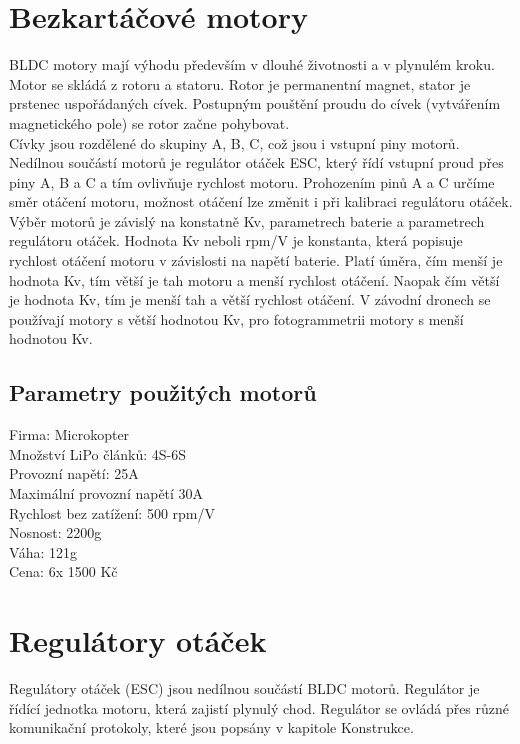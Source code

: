 \section{Bezkartáčové motory} 
BLDC motory mají výhodu především v dlouhé životnosti a v plynulém kroku. Motor se skládá z rotoru a statoru. Rotor je permanentní magnet, stator je prstenec uspořádaných cívek. Postupným pouštění proudu do cívek (vytvářením magnetického pole) se rotor začne pohybovat.\\
Cívky jsou rozdělené do skupiny A, B, C, což jsou i vstupní piny motorů.  Nedílnou součástí motorů je regulátor otáček ESC, který řídí vstupní proud přes piny A, B a C a tím ovlivňuje rychlost motoru. Prohozením pinů A a C určíme směr otáčení motoru, možnost otáčení lze změnit i při kalibraci regulátoru otáček.\\
Výběr motorů je závislý na konstatně Kv, parametrech baterie a parametrech regulátoru otáček. Hodnota Kv neboli rpm/V je konstanta, která popisuje rychlost otáčení motoru v závislosti na napětí baterie. Platí úměra, čím menší je hodnota Kv, tím větší je tah motoru  a menší rychlost otáčení. Naopak čím  větší je hodnota Kv, tím je menší tah a větší rychlost otáčení. V závodní dronech se používají motory s větší hodnotou Kv, pro fotogrammetrii motory s menší hodnotou Kv.\\

\subsection{Parametry použitých motorů} 
Firma: Microkopter\\
Množství LiPo článků: 4S-6S\\
Provozní napětí: 25A\\
Maximální provozní napětí 30A\\
Rychlost bez zatížení: 500 rpm/V\\
Nosnost: 2200g\\
Váha: 121g\\
Cena: 6x 1500 Kč\\

\section{Regulátory otáček} 
Regulátory otáček (ESC) jsou nedílnou součástí BLDC motorů. Regulátor je řídící jednotka motoru, která zajistí plynulý chod. Regulátor se ovládá přes různé komunikační protokoly, které jsou popsány v kapitole Konstrukce.\\

